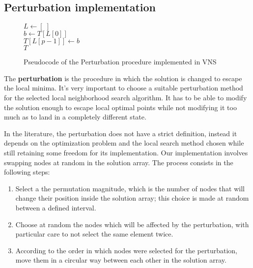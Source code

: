 \subsection{Perturbation implementation}

\begin{figure}[htbp]
    \begin{algorithm}[H]
        \BlankLine
        $L \gets [\;]$\\
        \For{$i \in \{0,1,\dots,p-1\}$}{
            \BlankLine
            $r \gets $ random in range $[0,|T|)$\\
            \lWhile{$r \in L$}{$r \gets $ random in range $[0,|T|)$}
            $L \gets L \cup \{r\}$
        }
        \BlankLine
        $b \gets T[L[0]]$\\
        \BlankLine
        \BlankLine
        $T[L[p-1]] \gets b$\\
        \BlankLine
        \Return $T$
    \end{algorithm}
    \caption{Pseudocode of the Perturbation procedure implemented in VNS} \label{fig:vnsPerturbPseudocode}
\end{figure}

The \textbf{perturbation} is the procedure in which the solution is changed to escape the local minima.
It's very important to choose a suitable perturbation method for the selected local neighborhood search algorithm.
It has to be able to modify the solution enough to escape local optimal points while not modifying it too much as to land in a completely different state.

In the literature, the perturbation does not have a strict definition, instead it depends on the optimization problem and the local search method chosen while still retaining some freedom for its implementation.
Our implementation involves swapping nodes at random in the solution array.
The process consists in the following steps:
\begin{enumerate}
    \item Select a the permutation magnitude, which is the number of nodes that will change their position inside the solution array; this choice is made at random between a defined interval.
    \item Choose at random the nodes which will be affected by the perturbation, with particular care to not select the same element twice.
    \item According to the order in which nodes were selected for the perturbation, move them in a circular way between each other in the solution array.
\end{enumerate}


